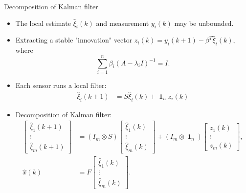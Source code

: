 \documentclass[10pt]{beamer}
\DeclareMathOperator{\1}{\textbf{1}}
\begin{document}
\begin{frame}{Decomposition of Kalman filter}
  \begin{itemize}
    \item The local estimate $\hat \xi_i(k)$ and measurement $y_i(k)$ may be unbounded.
    \item Extracting a stable "innovation" vector $z_i(k) = y_i(k+1)-\beta^T\hat\xi_i(k)$,  where
      \begin{displaymath}
    \sum_{i=1}^n \beta_i(A-\lambda_i I)^{-1}=I.
      \end{displaymath}
    \item Each sensor runs a local filter:
      \begin{align*}
	\hat \xi_i(k+1)&=S\hat\xi_i(k)+\1_n z_i(k)
      \end{align*}

    \item Decomposition of Kalman filter:
      \begin{align}
	\begin{bmatrix}
	  \hat \xi_1(k+1) \\
	  \vdots\\
	  \hat \xi_m(k+1)
	\end{bmatrix}&=
	(I_m\otimes S)
	\begin{bmatrix}
	  \hat \xi_1(k) \\
	  \vdots\\
	  \hat \xi_m(k)
	\end{bmatrix}+
	(I_m\otimes \1_n)
	\begin{bmatrix}
	  z_1(k) \\
	  \vdots\\
	  z_m(k)
	\end{bmatrix},\\
	\hat{x}(k) &= F
	\begin{bmatrix}
	  \hat \xi_1(k) \\
	  \vdots\\
	  \hat \xi_m(k)
	\end{bmatrix}.
      \end{align}
  \end{itemize}
\end{frame}
\end{document}
